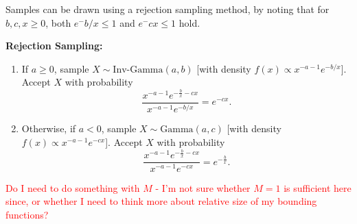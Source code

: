 	Samples can be drawn using a rejection sampling method, by noting that for $b,c,x \geq 0$, both $e^-b/x \leq 1$ and $e^-cx \leq 1$ hold.
	
	\textbf{Rejection Sampling:}
		\begin{enumerate}[1.]
			\item If $a \geq 0$, sample $X \sim \text{Inv-Gamma}(a,b)$ [with density $f(x) \propto x^{-a-1} e^{-b/x}$]. Accept $X$ with probability
				\[
					\frac{x^{-a-1} e^{-\frac{b}{x} - cx}}{x^{-a-1} e^{-b/x}} = e^{-cx}.
				\]
			\item Otherwise, if $a < 0$, sample $X \sim \text{Gamma}(a,c)$ [with density $f(x) \propto x^{-a -1} e^{-cx}$]. Accept $X$ with probability
				\[
					\frac{x^{-a-1} e^{-\frac{b}{x} - cx}}{x^{-a-1} e^{-cx}} = e^{-\frac{b}{x}}.
				\]
		\end{enumerate}
	
	\textcolor{red}{Do I need to do something with $M$ - I'm not sure whether $M=1$ is sufficient here since, or whether I need to think more about relative size of my bounding functions?}
	

